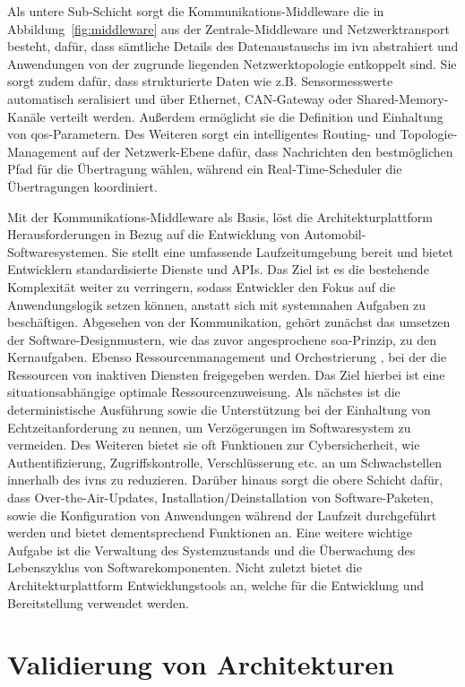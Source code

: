 Als untere Sub-Schicht sorgt die Kommunikations-Middleware die in Abbildung~\ref{fig:middleware} aus der Zentrale-Middleware und Netzwerktransport besteht, dafür, dass sämtliche Details des Datenaustauschs im \gls{ivn} abstrahiert und Anwendungen von der zugrunde liegenden Netzwerktopologie entkoppelt sind. Sie sorgt zudem dafür, dass strukturierte Daten wie z.B. Sensormesswerte automatisch seralisiert und über Ethernet, CAN-Gateway oder Shared-Memory-Kanäle verteilt werden. Außerdem ermöglicht sie die Definition und Einhaltung von \gls{qos}-Parametern. Des Weiteren sorgt ein intelligentes Routing- und Topologie-Management auf der Netzwerk-Ebene dafür, dass Nachrichten den bestmöglichen Pfad für die Übertragung wählen, während ein Real-Time-Scheduler die Übertragungen koordiniert.

Mit der Kommunikations-Middleware als Basis, löst die Architekturplattform Herausforderungen in Bezug auf die Entwicklung von Automobil-Softwaresystemen. Sie stellt eine umfassende Laufzeitumgebung bereit und bietet Entwicklern standardisierte Dienste und APIs. Das Ziel ist es die bestehende Komplexität weiter zu verringern, sodass Entwickler den Fokus auf die Anwendungslogik setzen können, anstatt sich mit systemnahen Aufgaben zu beschäftigen. Abgesehen von der Kommunikation, gehört zunächst das umsetzen der Software-Designmustern, wie das zuvor angesprochene \gls{soa}-Prinzip, zu den Kernaufgaben. Ebenso Ressourcenmanagement und Orchestrierung , bei der die Ressourcen von inaktiven Diensten freigegeben werden. Das Ziel hierbei ist eine situationsabhängige optimale Ressourcenzuweisung. Als nächstes ist die deterministische Ausführung sowie die Unterstützung bei der Einhaltung von Echtzeitanforderung zu nennen, um Verzögerungen im Softwaresystem zu vermeiden. Des Weiteren bietet sie oft Funktionen zur Cybersicherheit, wie Authentifizierung, Zugriffskontrolle, Verschlüsserung etc. an um Schwachstellen innerhalb des \glspl{ivn} zu reduzieren. Darüber hinaus sorgt die obere Schicht dafür, dass Over-the-Air-Updates, Installation/Deinstallation von Software-Paketen, sowie die Konfiguration von Anwendungen während der Laufzeit durchgeführt werden und bietet dementsprechend Funktionen an. Eine weitere wichtige Aufgabe ist die Verwaltung des Systemzustands und die Überwachung des Lebenszyklus von Softwarekomponenten. Nicht zuletzt bietet die Architekturplattform Entwicklungstools an, welche für die Entwicklung und Bereitstellung verwendet werden.

\section{Validierung von Architekturen}
\label{sect:validerung}

